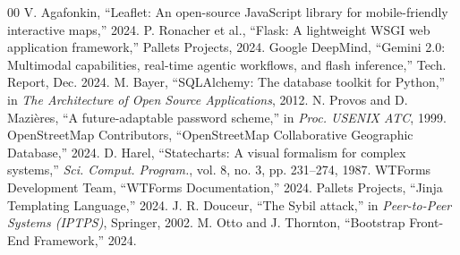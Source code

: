 \documentclass[conference]{IEEEtran}
\begin{document}
\begin{thebibliography}{00}
 V. Agafonkin, ``Leaflet: An open-source JavaScript library for mobile-friendly interactive maps,'' 2024.
 P. Ronacher et al., ``Flask: A lightweight WSGI web application framework,'' Pallets Projects, 2024.
 Google DeepMind, ``Gemini 2.0: Multimodal capabilities, real-time agentic workflows, and flash inference,'' Tech. Report, Dec. 2024.
 M. Bayer, ``SQLAlchemy: The database toolkit for Python,'' in \textit{The Architecture of Open Source Applications}, 2012.
 N. Provos and D. Mazières, ``A future-adaptable password scheme,'' in \textit{Proc. USENIX ATC}, 1999.
 OpenStreetMap Contributors, ``OpenStreetMap Collaborative Geographic Database,'' 2024.
 D. Harel, ``Statecharts: A visual formalism for complex systems,'' \textit{Sci. Comput. Program.}, vol. 8, no. 3, pp. 231--274, 1987.
 WTForms Development Team, ``WTForms Documentation,'' 2024.
 Pallets Projects, ``Jinja Templating Language,'' 2024.
 J. R. Douceur, ``The Sybil attack,'' in \textit{Peer-to-Peer Systems (IPTPS)}, Springer, 2002.
 M. Otto and J. Thornton, ``Bootstrap Front-End Framework,'' 2024.
\end{thebibliography}
\end{document}
